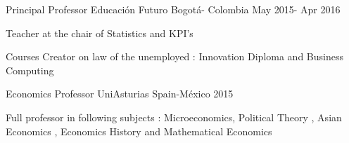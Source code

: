 \begin{cventries}
  \cventry
    {Principal Professor} %
    {Educación Futuro} %
    {Bogotá- Colombia} %
    {May 2015- Apr 2016} %
    {
      \begin{cvitems} %
        \item {Teacher at the chair of Statistics and KPI's}
        \item {Courses Creator on law of the unemployed : Innovation Diploma and Business Computing}
      \end{cvitems}
    }

  \cventry
    {Economics Professor} %
    {UniAsturias} %
    {Spain-México } %
    {2015} %
    {
      \begin{cvitems} %
        \item {Full professor in following subjects : Microeconomics, Political Theory , Asian Economics , Economics History and Mathematical Economics}
      \end{cvitems}
    }

\end{cventries}

